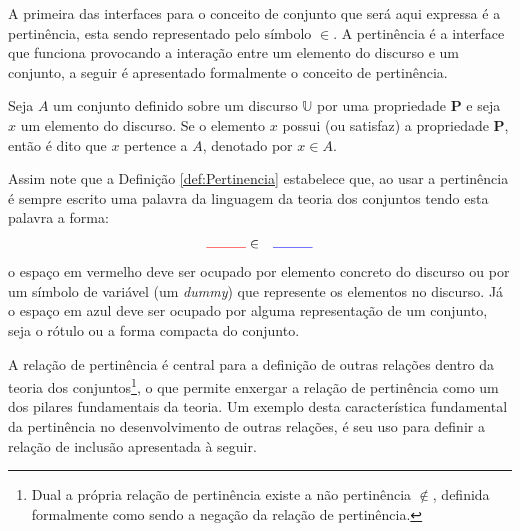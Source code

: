 A primeira das interfaces para o conceito de conjunto que será aqui expressa é a pertinência, esta sendo representado pelo símbolo $\in$. A pertinência é a interface que funciona provocando a interação entre um elemento do discurso e um conjunto, a seguir é apresentado formalmente o conceito de pertinência.

\begin{definicao}[Pertinência]\label{def:Pertinencia}
  Seja $A$ um conjunto definido sobre um discurso $\mathbb{U}$ por uma propriedade $\textbf{P}$ e seja $x$ um elemento do discurso. Se o elemento $x$ possui (ou satisfaz) a propriedade $\textbf{P}$, então é dito que $x$ pertence a $A$, denotado por $x \in A$.
\end{definicao}

Assim note que a Definição \ref{def:Pertinencia} estabelece que, ao usar a pertinência é sempre escrito uma palavra da linguagem da teoria dos conjuntos tendo esta palavra a forma:
\begin{eqnarray*}
  {\color{red}\rule{1cm}{0.4pt}} & \in & {\color{blue}\rule{1cm}{0.4pt}} 
\end{eqnarray*}
o espaço em {\color{red}vermelho} deve ser ocupado por elemento concreto do discurso ou por um símbolo de variável (um \textit{dummy}) que represente os elementos no discurso. Já o espaço em {\color{blue}azul} deve ser ocupado por alguma representação de um conjunto, seja o rótulo ou a forma compacta do conjunto.


A relação de pertinência é central para a definição de outras relações dentro da teoria dos conjuntos\footnote{Dual a própria relação de pertinência existe a não pertinência $\notin$, definida formalmente como sendo a negação da relação de pertinência.}, o que permite enxergar a relação de pertinência como um dos pilares fundamentais da teoria. Um exemplo desta característica fundamental da pertinência no desenvolvimento de outras relações, é seu uso para definir a relação de inclusão apresentada à seguir.

